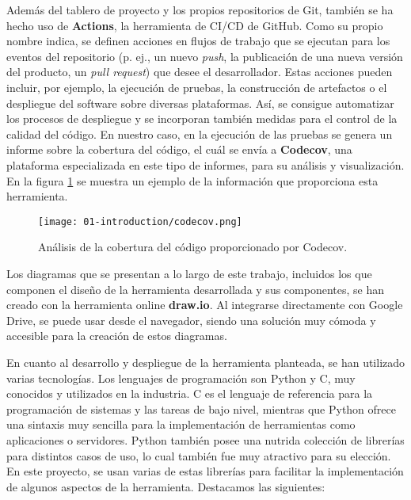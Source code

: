 Además del tablero de proyecto y los propios repositorios de Git, también se ha
hecho uso de \textbf{Actions}, la herramienta de CI/CD de GitHub. Como su propio
nombre indica, se definen acciones en flujos de trabajo que se ejecutan para los
eventos del repositorio (p. ej., un nuevo \textit{push}, la publicación de una
nueva versión del producto, un \textit{pull request}) que desee el
desarrollador. Estas acciones pueden incluir, por ejemplo, la ejecución de
pruebas, la construcción de artefactos o el despliegue del software sobre
diversas plataformas. Así, se consigue automatizar los procesos de despliegue y
se incorporan también medidas para el control de la calidad del código. En
nuestro caso, en la ejecución de las pruebas se genera un informe sobre la
cobertura del código, el cuál se envía a \textbf{Codecov}, una plataforma
especializada en este tipo de informes, para su análisis y visualización. En la
figura \ref{fig:01-codecov} se muestra un ejemplo de la información que
proporciona esta herramienta.

\begin{figure}
      \centering
      \texttt{[image: 01-introduction/codecov.png]}
      \caption{Análisis de la cobertura del código proporcionado por Codecov.}
      \label{fig:01-codecov}
\end{figure}

Los diagramas que se presentan a lo largo de este trabajo, incluidos los que
componen el diseño de la herramienta desarrollada y sus componentes, se han
creado con la herramienta online \textbf{draw.io}. Al integrarse directamente
con Google Drive, se puede usar desde el navegador, siendo una solución muy
cómoda y accesible para la creación de estos diagramas.

En cuanto al desarrollo y despliegue de la herramienta planteada, se han
utilizado varias tecnologías. Los lenguajes de programación son Python y C, muy
conocidos y utilizados en la industria. C es el lenguaje de referencia para la
programación de sistemas y las tareas de bajo nivel, mientras que Python ofrece
una sintaxis muy sencilla para la implementación de herramientas como
aplicaciones o servidores. Python también posee una nutrida colección de
librerías para distintos casos de uso, lo cual también fue muy atractivo para su
elección. En este proyecto, se usan varias de estas librerías para facilitar la
implementación de algunos aspectos de la herramienta. Destacamos las siguientes:


